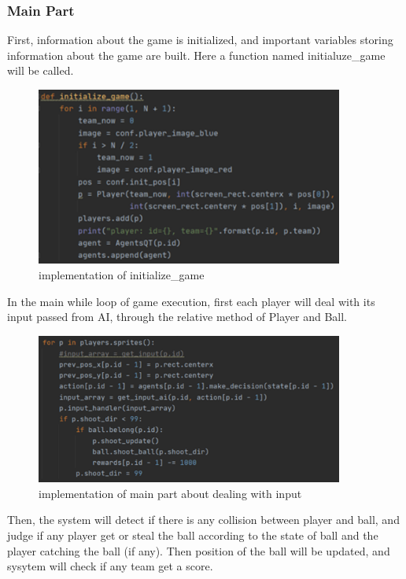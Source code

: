 \documentclass[14pt]{extarticle}
\begin{document}
\subsubsection{Main Part}
	First, information about the game is initialized, and important variables storing information about the game are built. Here a function named initialuze\_game will be called.
	\begin{figure}[H]
	\begin{center}
		\includegraphics[width=0.9\textwidth]{initialize_game}
		\caption{implementation of initialize\_game}
	\end{center}
	\end{figure}
	In the main while loop of game execution, first each player will deal with its input passed from AI, through the relative method of Player and Ball.
	\begin{figure}[H]
	\begin{center}
		\includegraphics[width=0.9\textwidth]{deal_with_input}
		\caption{implementation of main part about dealing with input}
	\end{center}
	\end{figure}
	Then, the system will detect if there is any collision between player and ball, and judge if any player get or steal the ball according to the state of ball and the player catching the ball (if any). Then position of the ball will be updated, and sysytem will check if any team get a score. 
\end{document}
